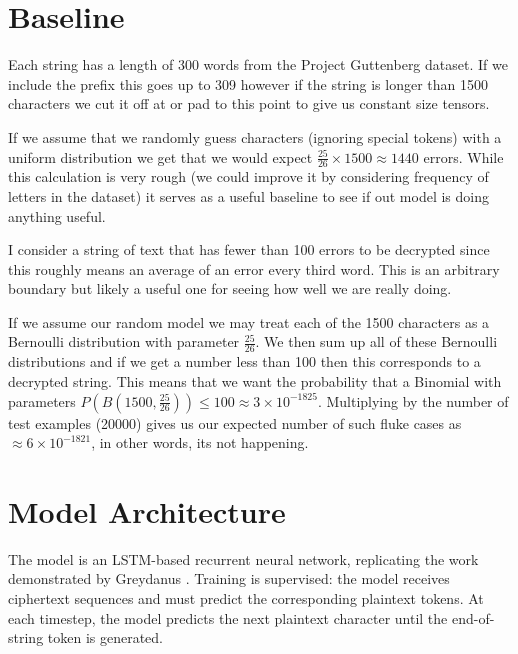 \documentclass[a4paper,11pt]{article}
\begin{document}
\section{Baseline}

Each string has a length of 300 words from the Project Guttenberg dataset. If we include the prefix this goes up to 309 however if the string is longer than 1500 characters we cut it off at or pad to this point to give us constant size tensors.

If we assume that we randomly guess characters (ignoring special tokens) with a uniform distribution we get that we would expect $\frac{25}{26} \times 1500 \approx 1440$ errors. While this calculation is very rough (we could improve it by considering frequency of letters in the dataset) it serves as a useful baseline to see if out model is doing anything useful.

I consider a string of text that has fewer than 100 errors to be decrypted since this roughly means an average of an error every third word. This is an arbitrary boundary but likely a useful one for seeing how well we are really doing.

If we assume our random model we may treat each of the 1500 characters as a Bernoulli distribution with parameter $\frac{25}{26}$. We then sum up all of these Bernoulli distributions and if we get a number less than 100 then this corresponds to a decrypted string. This means that we want the probability that a Binomial with parameters $P(B(1500, \frac{25}{26})) \le 100\approx 3\times 10^{-1825}$. Multiplying by the number of test examples (20000) gives us our expected number of such fluke cases as $\approx 6\times 10^{-1821}$, in other words, its not happening.

\section{Model Architecture}

The model is an LSTM-based recurrent neural network, replicating the work demonstrated by Greydanus \cite{greydanus2017enigma}. Training is supervised: the model receives ciphertext sequences and must predict the corresponding plaintext tokens. At each timestep, the model predicts the next plaintext character until the end-of-string token is generated.
\end{document}
